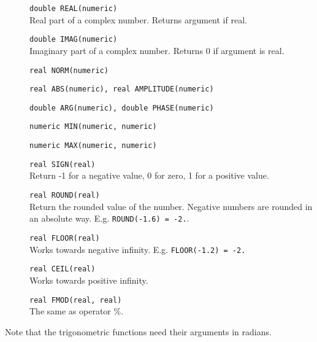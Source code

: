 \begin{description}
  \item[] \texttt{double REAL(numeric)}\\
    Real part of a complex number. Returns argument if real.
  \item[] \texttt{double IMAG(numeric)}\\
    Imaginary part of a complex number. Returns 0 if argument is real.
  \item[] \texttt{real NORM(numeric)}
  \item[] \texttt{real ABS(numeric),  real AMPLITUDE(numeric)}
  \item[] \texttt{double ARG(numeric),  double PHASE(numeric)}
  \item[] \texttt{numeric MIN(numeric, numeric)}
  \item[] \texttt{numeric MAX(numeric, numeric)}
  \item[] \texttt{real SIGN(real)}\\
    Return -1 for a negative value, 0 for zero, 1 for a positive value.
  \item[] \texttt{real ROUND(real)}\\
    Return the rounded value of the number. Negative numbers are
    rounded in an absolute way.
    E.g. \texttt{ROUND(-1.6) = -2.}.
  \item[] \texttt{real FLOOR(real)}\\
    Works towards negative infinity.
    E.g. \texttt{FLOOR(-1.2) = -2.}
  \item[] \texttt{real CEIL(real)}\\
    Works towards positive infinity.
  \item[] \texttt{real FMOD(real, real)}\\
    The same as operator \%.
\end{description}
Note that the trigonometric functions need their arguments in radians.

